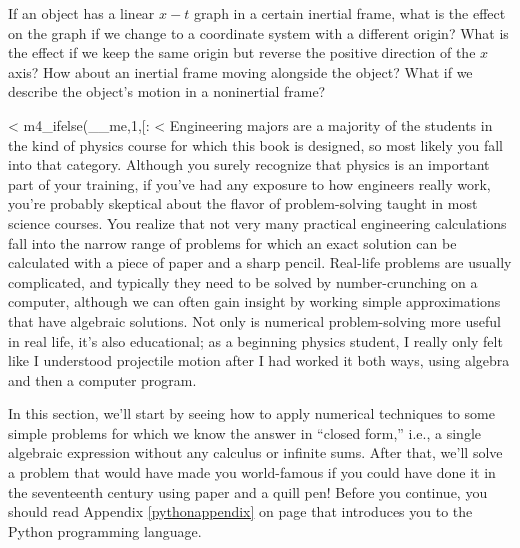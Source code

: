 \pagebreak

\startdq

\begin{dq}
If an object has a linear $x-t$ graph in a certain inertial
frame, what is the effect on the graph if we change to a
coordinate system with a different origin? What is the
effect if we keep the same origin but reverse the positive
direction of the $x$ axis? How about an inertial frame
moving alongside the object? What if we describe the
object's motion in a noninertial frame?
\end{dq}

<%
m4_ifelse(__me,1,[:
<%
        Engineering majors are a majority of the students in the kind of physics
        course for which this book is designed, so most likely you fall into that category.
        Although you surely recognize that physics is an important
        part of your training, if you've had any exposure to how engineers really
        work, you're probably skeptical about the flavor of problem-solving
        taught in most science courses. You
        realize that not very many practical engineering calculations fall
        into the narrow range of problems for which an exact solution can be calculated
        with a piece of paper and a sharp pencil. Real-life problems are usually
        complicated, and typically they need to be solved by number-crunching on a computer,
        although we can often gain insight by working simple approximations that
        have algebraic solutions. Not only is numerical problem-solving more useful
        in real life, it's also educational; as a beginning physics student, I really only felt like
        I understood projectile motion after I had worked it both ways, using algebra
        and then a computer program.
        
        In this section, we'll start by seeing how to apply numerical techniques
        to some simple problems for which we know the answer in ``closed form,'' i.e.,
        a single algebraic expression without any calculus or infinite sums.
        After that, we'll solve a problem that would have made you world-famous
        if you could have done it in the seventeenth century using
        paper and a quill pen!
        Before you continue, you should read Appendix \ref{pythonappendix} on page
        \pageref{pythonappendix} that introduces you to the Python programming
        language.

